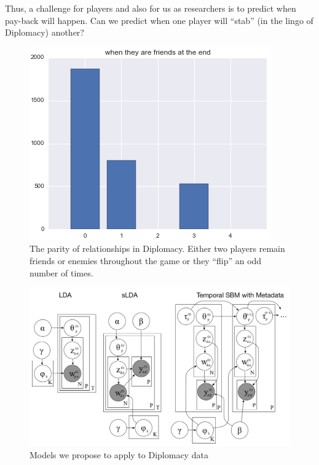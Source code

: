 \documentclass[11pt,letterpaper]{article}
\begin{document}
Thus, a challenge for players and also for us as researchers is to
predict when pay-back will happen.  Can we predict when one player will
``stab'' (in the lingo of Diplomacy) another?

\begin{figure}[tbh]
  \begin{center}
    \includegraphics[width=0.9\linewidth]{figures/flip_distribution_split}
    \caption{The parity of relationships in Diplomacy.  Either two
      players remain friends or enemies throughout the game or they
      ``flip'' an odd number of times.}
    \label{fig:parity}
  \end{center}
\end{figure}

\begin{figure}
  \includegraphics[width=0.9\linewidth]{figures/graphical_model}
  \caption{Models we propose to apply to Diplomacy data}
\end{figure}
\end{document}
